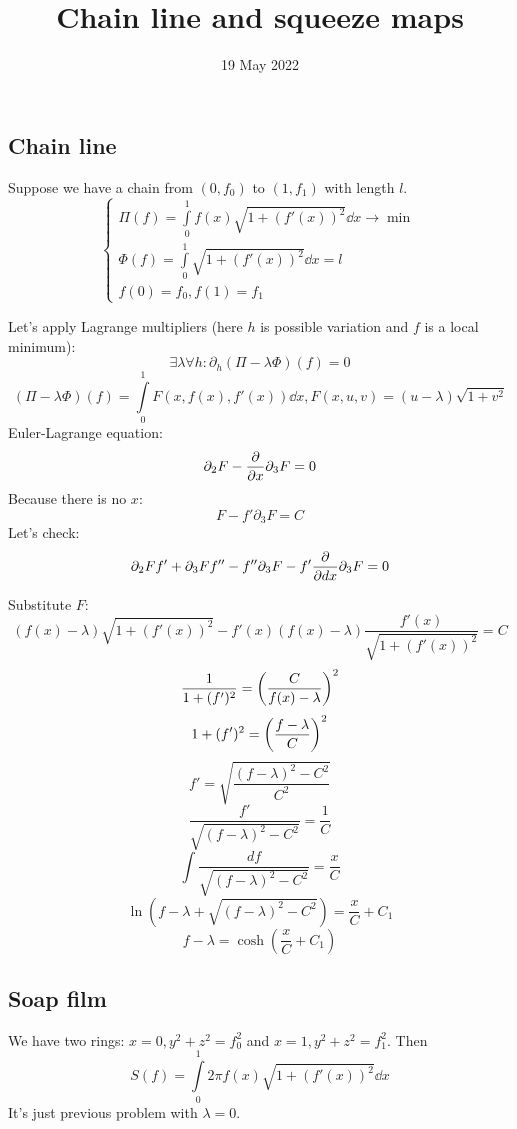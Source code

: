 
\title{Chain line and squeeze maps}
\author{}
\date{19 May 2022}

\maketitle

\subsection*{Chain line}

Suppose we have a chain from $(0, f_0)$ to $(1, f_1)$ with length $l$.
\[ \begin{cases}
    \Pi(f) = \int\limits_0^1 f(x)\sqrt{1 + (f'(x))^2} \dd{x} \to \min \\
    \Phi(f) = \int\limits_0^1 \sqrt{1 + (f'(x))^2} \dd{x} = l \\
    f(0) = f_0, f(1) = f_1
\end{cases} \] 

Let's apply Lagrange multipliers (here $h$ is possible variation and $f$ is a local minimum):
\[ \exists \lambda \forall h: \partial_h (\Pi - \lambda \Phi)(f) = 0 \] 
\[ (\Pi - \lambda \Phi)(f) = \int\limits_0^1 F(x, f(x), f'(x)) \dd{x}, F(x, u, v) = (u - \lambda)\sqrt{1 + v^2} \] 
Euler-Lagrange equation:
\[ \partial_2 F - \pdv{x} \partial_3 F = 0 \] 
Because there is no $x$:
\[ F - f' \partial_3 F = C \] 
Let's check:
\[ \partial_2 F f'  + \partial_3 F f'' - f'' \partial_3 F - f' \pdv{dx} \partial_3 F  = 0 \]

Substitute $F$:
\[ (f(x) - \lambda)\sqrt{1 + (f'(x))^2} - f'(x)(f(x) - \lambda)\frac{f'(x)}{\sqrt{1 + (f'(x))^2}} = C \] 
\[ \frac{1}{1 + (f')^2} = \qty(\frac{C}{f(x) - \lambda})^2 \] 
\[ 1 + (f')^2 = \qty(\frac{f - \lambda}{C})^2 \] 
\[ f' = \sqrt{\frac{(f - \lambda)^2 - C^2}{C^2}} \]
\[ \frac{f'}{\sqrt{(f - \lambda)^2 - C^2}} = \frac{1}{C} \] 
\[ \int \frac{df}{\sqrt{(f-\lambda)^2 - C^2}} = \frac{x}{C} \] 
\[ \ln(f - \lambda + \sqrt{(f - \lambda)^2 - C^2}) = \frac{x}{C} + C_1 \] 
\[ f - \lambda = \cosh(\frac{x}{C} + C_1) \]

\subsection*{Soap film}

We have two rings: $x = 0, y^2 + z^2 = f_0^2$ and $x = 1, y^2 + z^2 = f_1^2$. Then
\[ S(f) = \int\limits_0^1 2 \pi f(x) \sqrt{1 + (f'(x))^2} \dd{x} \] 
It's just previous problem with $\lambda = 0$.

